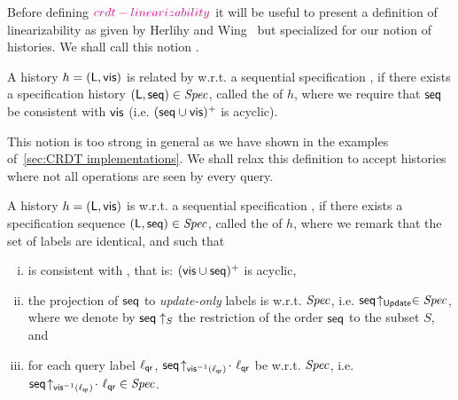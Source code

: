 Before defining ${\color{magenta} crdt-linearizability}{}$ it will be useful to present a definition
of linearizability as given by Herlihy and Wing~\cite{HerlihyW90} but
specialized for our notion of histories.
We shall call this notion \HWLin{}.

\begin{definition}[\HWLin{}]
  A history $h = (\mathsf{L},\mathsf{vis})$ is related by \HWLin{}
  w.r.t.
  a sequential specification \Spec{}, if there exists a specification
  history $(\mathsf{L}, \mathsf{seq}) \in \mathit{Spec}$,
  called the \hwlinearization{} of $h$, where we require that $\mathsf{seq}$ be
  consistent with $\mathsf{vis}$ (i.e.
  $(\mathsf{seq} \cup \mathsf{vis})^+$ is acyclic).
\end{definition}

This notion is too strong in general as we have shown in the examples
of~\autoref{sec:CRDT implementations}.
We shall relax this definition to accept histories where
not all operations are seen by every query.

\begin{definition}[\CRDTLin{}]
  \label{definition:distributed linearizability} A history $h =
  (\mathsf{L},\mathsf{vis})$ is \CRDTLin{} w.r.t. a
   sequential specification
  \Spec{}, if there exists a specification sequence
  $(\mathsf{L}, \mathsf{seq}) \in \mathit{Spec}{}$, called the
  \crdtlinearization{} of $h$, where we remark that the set of labels
  are identical, and such that %
  \begin{enumerate}[(i)]
  \item \aseqord{} is consistent with  \avisord{}, that is: $(\mathsf{vis}
    \cup \mathsf{seq})^{+}$ is acyclic,
  \item the projection of $\mathsf{seq}$ to \emph{update-only} labels is
    \hwlinearizable{} w.r.t. $\mathit{Spec}$, i.e.
    $\mathsf{seq}\!\uparrow_{\mathsf{Update}} \in \mathit{Spec}$, where we denote by
    $\mathsf{seq}\uparrow_{S}$ the restriction of the order $\mathsf{seq}$ to
    the subset $S$, and
  \item for each query label $\ell_{\mathsf{qr}}$,
    $\mathsf{seq}\!\uparrow_{\mathsf{vis}^{-1}(\ell_{\mathsf{qr}})}\!\cdot\
    \ell_{\mathsf{qr}}$ be \hwlinearizable{} w.r.t. $\mathit{Spec}$, i.e.
    $\mathsf{seq}\!\uparrow_{\mathsf{vis}^{-1}(\ell_{\mathsf{qr}})}\!\cdot\
    \ell_{\mathsf{qr}} \in \mathit{Spec}$.
\end{enumerate}
\end{definition}

